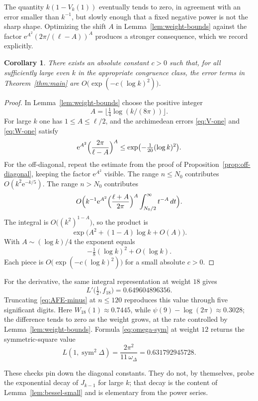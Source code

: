 \documentclass[11pt]{amsart}
\newtheorem{corollary}[theorem]{Corollary}
\theoremstyle{definition}
\theoremstyle{remark}
\numberwithin{equation}{section}
\DeclareMathOperator{\sym}{sym}
\newcommand{\ee}{\mathrm{e}}
\begin{document}
The quantity $k(1-V_k(1))$ eventually tends to zero, in agreement with an error smaller than $k^{-1}$, but slowly enough that a fixed negative power is not the sharp shape. Optimizing the shift $A$ in Lemma~\ref{lem:weight-bounds} against the factor $\ee^{A^2}(2\pi/(\ell-A))^A$ produces a stronger consequence, which we record explicitly.

\begin{corollary}\label{cor:log-square}
There exists an absolute constant $c>0$ such that, for all sufficiently large even $k$ in the appropriate congruence class, the error terms in Theorem~\ref{thm:main} are $O\bigl(\exp(-c(\log k)^2)\bigr)$.
\end{corollary}

\begin{proof}
In Lemma~\ref{lem:weight-bounds} choose the positive integer
\[
A=\bigl\lfloor\tfrac14\log(k/(8\pi))\bigr\rfloor.
\]
For large $k$ one has $1\le A\le\ell/2$, and the archimedean errors \eqref{eq:V-one} and \eqref{eq:W-one} satisfy
\[
\ee^{A^2}\Bigl(\frac{2\pi}{\ell-A}\Bigr)^A
\le\exp\bigl(-\tfrac1{20}(\log k)^2\bigr).
\]
For the off-diagonal, repeat the estimate from the proof of Proposition~\ref{prop:off-diagonal}, keeping the factor $\ee^{A^2}$ visible.
The range $n\le N_0$ contributes $O(k^2\ee^{-k/5})$.
The range $n>N_0$ contributes
\[
O\Bigl(k^{-1}\ee^{A^2}\Bigl(\frac{\ell+A}{2\pi}\Bigr)^A\int_{N_0/2}^\infty t^{-A}\,dt\Bigr).
\]
The integral is $O\bigl((k^2)^{1-A}\bigr)$, so the product is
\[
\exp\bigl(A^2+(1-A)\log k+O(A)\bigr).
\]
With $A\sim(\log k)/4$ the exponent equals
\[
-\tfrac18(\log k)^2+O(\log k).
\]
Each piece is $O\bigl(\exp(-c(\log k)^2)\bigr)$ for a small absolute $c>0$.
\end{proof}

For the derivative, the same integral representation at weight $18$ gives
\[
L'\bigl(\tfrac12,f_{18}\bigr)=0.649604896356.
\]
Truncating \eqref{eq:AFE-minus} at $n\le 120$ reproduces this value through five significant digits. Here $W_{18}(1)\approx 0.7445$, while $\psi(9)-\log(2\pi)\approx 0.3028$; the difference tends to zero as the weight grows, at the rate controlled by Lemma~\ref{lem:weight-bounds}. Formula \eqref{eq:omega-sym} at weight $12$ returns the symmetric-square value
\[
L(1,\sym^2\Delta)
=\frac{2\pi^2}{11\,\omega_\Delta}
=0.631792945728.
\]

These checks pin down the diagonal constants. They do not, by themselves, probe the exponential decay of $J_{k-1}$ for large $k$; that decay is the content of Lemma~\ref{lem:bessel-small} and is elementary from the power series.
\end{document}

